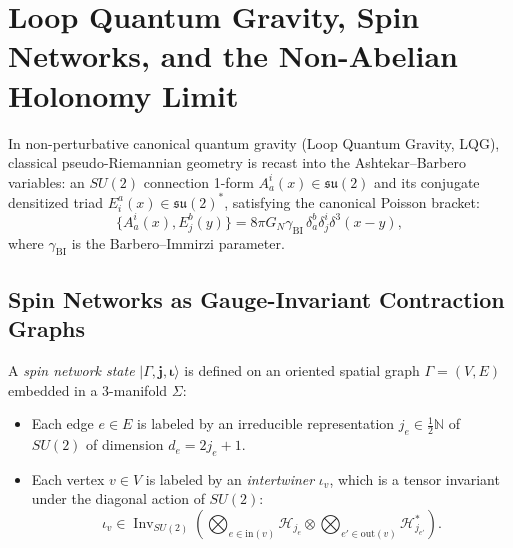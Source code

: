\documentclass[11pt,a4paper,reqno]{amsart}
\theoremstyle{definition}
\numberwithin{equation}{section}
\newcommand{\N}{\mathbb{N}}
\begin{document}
\section{Loop Quantum Gravity, Spin Networks, and the Non-Abelian Holonomy Limit}
\label{sec:lqg_spin_networks}

In non-perturbative canonical quantum gravity (Loop Quantum Gravity, LQG), classical pseudo-Riemannian geometry is recast into the Ashtekar--Barbero variables: an $SU(2)$ connection 1-form $A_a^i(x) \in \mathfrak{su}(2)$ and its conjugate densitized triad $E_i^a(x) \in \mathfrak{su}(2)^*$, satisfying the canonical Poisson bracket:
\begin{equation}
    \{A_a^i(x), E_j^b(y)\} = 8\pi G_N \gamma_{\mathrm{BI}} \, \delta_a^b \delta_j^i \delta^3(x - y),
\end{equation}
where $\gamma_{\mathrm{BI}}$ is the Barbero--Immirzi parameter.

\subsection{Spin Networks as Gauge-Invariant Contraction Graphs}
A \emph{spin network state} $|\Gamma, \mathbf{j}, \mathbf{\iota}\rangle$ is defined on an oriented spatial graph $\Gamma = (V, E)$ embedded in a 3-manifold $\Sigma$:
\begin{itemize}
    \item Each edge $e \in E$ is labeled by an irreducible representation $j_e \in \frac{1}{2}\N$ of $SU(2)$ of dimension $d_e = 2j_e + 1$.
    \item Each vertex $v \in V$ is labeled by an \emph{intertwiner} $\iota_v$, which is a tensor invariant under the diagonal action of $SU(2)$:
    \begin{equation}
        \iota_v \in \operatorname{Inv}_{SU(2)}\left( \bigotimes_{e \in \mathrm{in}(v)} \mathcal{H}_{j_e} \otimes \bigotimes_{e' \in \mathrm{out}(v)} \mathcal{H}_{j_{e'}}^* \right).
    \end{equation}
\end{itemize}
\end{document}
